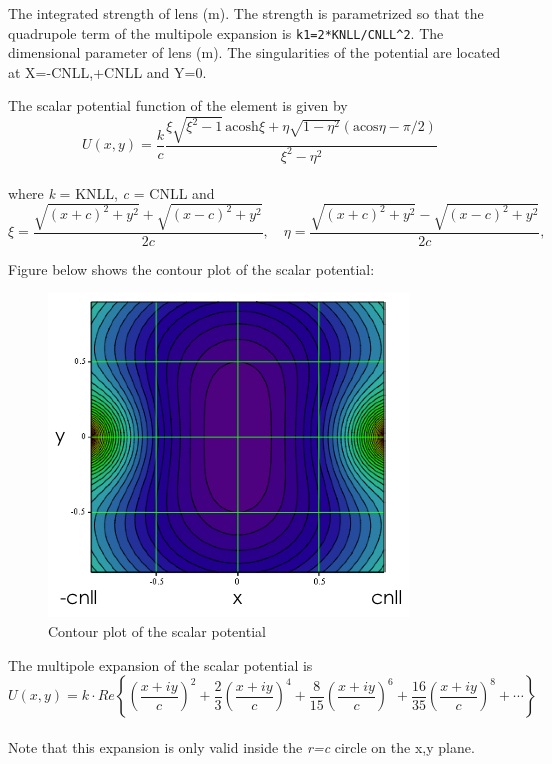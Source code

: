 \begin{madlist}
    The integrated strength of lens (m). The strength is
     parametrized so that the quadrupole term of the multipole
     expansion is \texttt{k1=2*KNLL/CNLL\textasciicircum2}.      
    The dimensional parameter of lens (m). The singularities
     of the potential are located at X=-CNLL,+CNLL and Y=0.  
\end{madlist}

The scalar potential function of the element is given by
\begin{equation}
U(x,y)=\frac{k}{c}\frac{\xi\sqrt{\xi^2-1} \, \text{acosh}\xi +  
  \eta\sqrt{1-\eta^2}(\text{acos}\eta-\pi/2)}{\xi^2-\eta^2}
\end{equation}
\\ where \textit{k} = KNLL, \textit{c} = CNLL and 
\begin{equation}
\xi = \frac{\sqrt{(x+c)^2+y^2}+\sqrt{(x-c)^2+y^2}}{2c}, 
\quad \eta = \frac{\sqrt{(x+c)^2+y^2}-\sqrt{(x-c)^2+y^2}}{2c},
\end{equation}

Figure below shows the contour plot of the scalar potential: \\
\begin{figure}
  \centering
  \includegraphics[width=220bp]{jpg/nllens_potential-2D.jpg}
  \caption{Contour plot of the scalar potential}
  \label{fig:nllens-potential}
\end{figure}

The multipole expansion of the scalar potential is \\
\begin{equation}
U(x,y)=k\cdot Re\left\{ \left(\dfrac{x + i y}{c}\right)^2 + 
\frac{2}{3}\left(\dfrac{x + i y}{c}\right)^4 +
\frac{8}{15}\left(\dfrac{x + i y}{c}\right)^6 + 
\frac{16}{35}\left(\dfrac{x + i y}{c}\right)^8 + \cdots \right\}
\end{equation}
\\ 
Note that this expansion is only valid inside the \textit{r=c} circle on
the x,y plane.    

